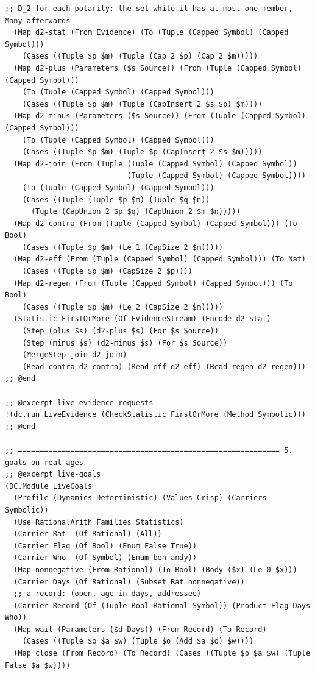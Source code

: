 \documentclass[11pt]{article}
\theoremstyle{definition}
\theoremstyle{plain}
\begin{document}
\begin{lstlisting}[style=mettafull]
  ;; D_2 for each polarity: the set while it has at most one member, Many afterwards
  (Map d2-stat (From Evidence) (To (Tuple (Capped Symbol) (Capped Symbol)))
    (Cases ((Tuple $p $m) (Tuple (Cap 2 $p) (Cap 2 $m)))))
  (Map d2-plus (Parameters ($s Source)) (From (Tuple (Capped Symbol) (Capped Symbol)))
    (To (Tuple (Capped Symbol) (Capped Symbol)))
    (Cases ((Tuple $p $m) (Tuple (CapInsert 2 $s $p) $m))))
  (Map d2-minus (Parameters ($s Source)) (From (Tuple (Capped Symbol) (Capped Symbol)))
    (To (Tuple (Capped Symbol) (Capped Symbol)))
    (Cases ((Tuple $p $m) (Tuple $p (CapInsert 2 $s $m)))))
  (Map d2-join (From (Tuple (Tuple (Capped Symbol) (Capped Symbol))
                            (Tuple (Capped Symbol) (Capped Symbol))))
    (To (Tuple (Capped Symbol) (Capped Symbol)))
    (Cases ((Tuple (Tuple $p $m) (Tuple $q $n))
      (Tuple (CapUnion 2 $p $q) (CapUnion 2 $m $n)))))
  (Map d2-contra (From (Tuple (Capped Symbol) (Capped Symbol))) (To Bool)
    (Cases ((Tuple $p $m) (Le 1 (CapSize 2 $m)))))
  (Map d2-eff (From (Tuple (Capped Symbol) (Capped Symbol))) (To Nat)
    (Cases ((Tuple $p $m) (CapSize 2 $p))))
  (Map d2-regen (From (Tuple (Capped Symbol) (Capped Symbol))) (To Bool)
    (Cases ((Tuple $p $m) (Le 2 (CapSize 2 $m)))))
  (Statistic FirstOrMore (Of EvidenceStream) (Encode d2-stat)
    (Step (plus $s) (d2-plus $s) (For $s Source))
    (Step (minus $s) (d2-minus $s) (For $s Source))
    (MergeStep join d2-join)
    (Read contra d2-contra) (Read eff d2-eff) (Read regen d2-regen)))
;; @end

;; @excerpt live-evidence-requests
!(dc.run LiveEvidence (CheckStatistic FirstOrMore (Method Symbolic)))
;; @end

;; ============================================================ 5. goals on real ages
;; @excerpt live-goals
(DC.Module LiveGoals
  (Profile (Dynamics Deterministic) (Values Crisp) (Carriers Symbolic))
  (Use RationalArith Families Statistics)
  (Carrier Rat  (Of Rational) (All))
  (Carrier Flag (Of Bool) (Enum False True))
  (Carrier Who  (Of Symbol) (Enum ben andy))
  (Map nonnegative (From Rational) (To Bool) (Body ($x) (Le 0 $x)))
  (Carrier Days (Of Rational) (Subset Rat nonnegative))
  ;; a record: (open, age in days, addressee)
  (Carrier Record (Of (Tuple Bool Rational Symbol)) (Product Flag Days Who))
  (Map wait (Parameters ($d Days)) (From Record) (To Record)
    (Cases ((Tuple $o $a $w) (Tuple $o (Add $a $d) $w))))
  (Map close (From Record) (To Record) (Cases ((Tuple $o $a $w) (Tuple False $a $w))))


\end{lstlisting}
\end{document}
